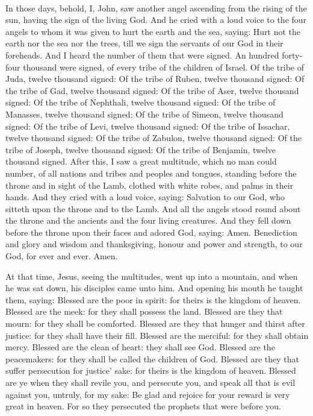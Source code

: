 ~

\columnbreak




In those days, behold, I, John, saw another angel ascending from the rising of the sun,
having the sign of the living God. And he cried with a loud voice to the
four angels to whom it was given to hurt the earth and the sea,
saying: Hurt not the earth nor the sea nor the trees, till we sign
the servants of our God in their foreheads.
And I heard the number of them that were signed. An hundred forty-
four thousand were signed, of every tribe of the children of Israel.
Of the tribe of Juda, twelve thousand signed: Of the tribe of
Ruben, twelve thousand signed: Of the tribe of Gad, twelve thousand
signed:
Of the tribe of Aser, twelve thousand signed: Of the tribe of
Nephthali, twelve thousand signed: Of the tribe of Manasses, twelve
thousand signed:
Of the tribe of Simeon, twelve thousand signed: Of the tribe of
Levi, twelve thousand signed: Of the tribe of Issachar, twelve thousand
signed:
Of the tribe of Zabulon, twelve thousand signed: Of the tribe of
Joseph, twelve thousand signed: Of the tribe of Benjamin, twelve
thousand signed.
After this, I saw a great multitude, which no man could number, of
all nations and tribes and peoples and tongues, standing before the
throne and in sight of the Lamb, clothed with white robes, and palms in
their hands.
And they cried with a loud voice, saying: Salvation to our God,
who sitteth upon the throne and to the Lamb.
And all the angels stood round about the throne and the ancients
and the four living creatures. And they fell down before the throne upon
their faces and adored God,
saying: Amen. Benediction and glory and wisdom and thanksgiving,
honour and power and strength, to our God, for ever and ever. Amen.



At that time, Jesus, seeing the multitudes, went up into a mountain, and when he
was sat down, his disciples came unto him.
And opening his mouth he taught them, saying:
Blessed are the poor in spirit: for theirs is the kingdom of
heaven.
Blessed are the meek: for they shall possess the land.
Blessed are they that mourn: for they shall be comforted.
Blessed are they that hunger and thirst after justice: for they
shall have their fill.
Blessed are the merciful: for they shall obtain mercy.
Blessed are the clean of heart: they shall see God.
Blessed are the peacemakers: for they shall be called the children
of God.
Blessed are they that suffer persecution for justice' sake: for
theirs is the kingdom of heaven.
Blessed are ye when they shall revile you, and persecute you, and
speak all that is evil against you, untruly, for my sake:
Be glad and rejoice for your reward is very great in heaven. For
so they persecuted the prophets that were before you.


